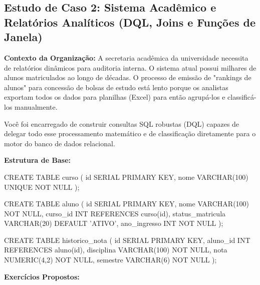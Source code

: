 \subsection{Estudo de Caso 2: Sistema Acadêmico e Relatórios Analíticos (DQL, Joins e Funções de Janela)}

\textbf{Contexto da Organização:}
A secretaria acadêmica da universidade necessita de relatórios dinâmicos para auditoria interna. O sistema atual possui milhares de alunos matriculados ao longo de décadas. O processo de emissão de "rankings de alunos" para concessão de bolsas de estudo está lento porque os analistas exportam todos os dados para planilhas (Excel) para então agrupá-los e classificá-los manualmente.

Você foi encarregado de construir consultas SQL robustas (DQL) capazes de delegar todo esse processamento matemático e de classificação diretamente para o motor do banco de dados relacional.

\textbf{Estrutura de Base:}
\begin{sqlcode}
CREATE TABLE curso (
    id SERIAL PRIMARY KEY,
    nome VARCHAR(100) UNIQUE NOT NULL
);

CREATE TABLE aluno (
    id SERIAL PRIMARY KEY,
    nome VARCHAR(100) NOT NULL,
    curso_id INT REFERENCES curso(id),
    status_matricula VARCHAR(20) DEFAULT 'ATIVO',
    ano_ingresso INT NOT NULL
);

CREATE TABLE historico_nota (
    id SERIAL PRIMARY KEY,
    aluno_id INT REFERENCES aluno(id),
    disciplina VARCHAR(100) NOT NULL,
    nota NUMERIC(4,2) NOT NULL,
    semestre VARCHAR(6) NOT NULL
);
\end{sqlcode}

\textbf{Exercícios Propostos:}

